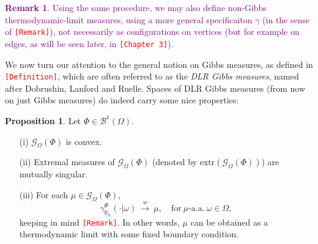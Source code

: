 \documentclass[12pt]{article}
\newcommand{\BB}{\mathscr{B}}
\newcommand{\BBB}{\mathbb{B}}
\newcommand{\G}{\mathcal{G}}
\newcommand{\extr}{\mathrm{extr}}
\newcommand{\pika}{\boldsymbol{\cdot}}
\newcommand{\1}{\mathbbm{1}}
\newcommand{\5}{\vspace{0.5cm}}
\theoremstyle{definition}
\newtheorem{prop}[thm]{Proposition}
\newtheorem{rem}[thm]{Remark}
\begin{document}
\textcolor{purple}{
\begin{rem}
Using the same procedure, we may also define non-Gibbs thermodynamic-limit measures, using a more general specificaiton $\gamma$ (in the sense of \textcolor{red}{\texttt{[Remark]}}), not necessarily as configurations on vertices (but for example on edges, as will be seen later, in \textcolor{red}{\texttt{[Chapter 3]}}).
\end{rem}
}

We now turn our attention to the general notion on Gibbs measures, as defined in \textcolor{red}{\texttt{[Definition]}}, which are often referred to as the \textit{DLR Gibbs measures}, named after Dobrushin, Lanford and Ruelle. Spaces of DLR Gibbs measures (from now on just Gibbs measures) do indeed carry some nice properties:
\begin{prop}
Let $\Phi\in\BB^1(\Omega)$.
\begin{itemize}
	\item[(i)] $\G_\Omega(\Phi)$ is convex.
	\item[(ii)] Extremal measures of $\G_\Omega(\Phi)$ (denoted by $\extr(\G_\Omega(\Phi))$) are mutually singular.
	\item[(iii)] For each $\mu\in\G_\Omega(\Phi)$,
	$$\gamma_{\BBB_n}^\Phi(\pika|\omega) ~\xrightarrow{w}~ \mu, \quad \text{for}~\mu\text{-a.a.}~\omega\in\Omega,$$
	keeping in mind \textcolor{red}{\texttt{[Remark]}}. In other words, $\mu$ can be obtained as a thermodynamic limit with some fixed boundary condition.
\end{itemize}
\end{prop}
\end{document}

